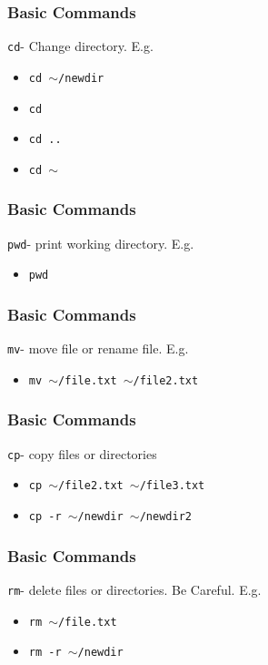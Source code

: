 \documentclass{beamer}
\newcommand{\code}[1]{\colorbox{codegray}{\texttt{#1}}}
\begin{document}
\begin{frame}
\frametitle{Basic Commands}
\code{cd}- Change directory. E.g.
\bigskip
\begin{itemize}
    \item \code{cd $\sim$/newdir}
    \pause
    \bigskip
    \item \code{cd}
    \pause
    \bigskip
    \item \code{cd ..}
    \pause
    \bigskip
    \item \code{cd $\sim$} 
\end{itemize}
\end{frame}


\begin{frame}
\frametitle{Basic Commands}
\code{pwd}- print working directory. E.g.
\bigskip
\begin{itemize}
    \item \code{pwd}
\end{itemize}
\end{frame}




\begin{frame}
\frametitle{Basic Commands}
\code{mv}- move file or rename file. E.g.
\bigskip
\begin{itemize}
    \item \code{mv $\sim$/file.txt $\sim$/file2.txt}
\end{itemize}
\end{frame}

\begin{frame}
\frametitle{Basic Commands}
\code{cp}- copy files or directories
\bigskip
\begin{itemize}
    \item \code{cp $\sim$/file2.txt $\sim$/file3.txt}
    \pause
    \bigskip
    \item \code{cp -r $\sim$/newdir $\sim$/newdir2}
\end{itemize}
\end{frame}


\begin{frame}
\frametitle{Basic Commands}
\code{rm}- delete files or directories. Be Careful. E.g.
\bigskip
\begin{itemize}
    \item \code{rm $\sim$/file.txt}
    \pause
    \bigskip
    \item \code{rm -r $\sim$/newdir}
\end{itemize}
\end{frame}
\end{document}
